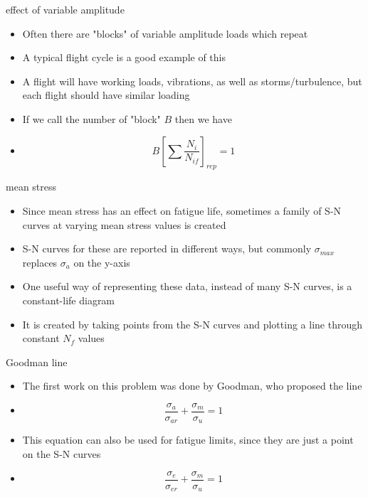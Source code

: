 \documentclass[10pt]{beamer}
\begin{document}
\begin{frame}{effect of variable amplitude}
	\begin{itemize}[<+->]
		\item Often there are "blocks" of variable amplitude loads which repeat
		\item A typical flight cycle is a good example of this
		\item A flight will have working loads, vibrations, as well as storms/turbulence, but each flight should have similar loading
		\item If we call the number of "block" $B$ then we have
		\item[] \begin{equation}
		B \left[\sum \frac{N_i}{N_{if}}\right]_{rep} = 1
		\end{equation}
	\end{itemize}
\end{frame}

\begin{frame}{mean stress}
	\begin{itemize}[<+->]
		\item Since mean stress has an effect on fatigue life, sometimes a family of S-N curves at varying mean stress values is created
		\item S-N curves for these are reported in different ways, but commonly $\sigma_{max}$ replaces $\sigma_a$ on the y-axis
		\item One useful way of representing these data, instead of many S-N curves, is a constant-life diagram
		\item It is created by taking points from the S-N curves and plotting a line through constant $N_f$ values
	\end{itemize}
\end{frame}

\begin{frame}{Goodman line}
	\begin{itemize}[<+->]
		\item The first work on this problem was done by Goodman, who proposed the line
		\item[] \begin{equation}
		\frac{\sigma_a}{\sigma_{ar}} + \frac{\sigma_m}{\sigma_u} = 1
		\end{equation}
		\item This equation can also be used for fatigue limits, since they are just a point on the S-N curves
		\item[] \begin{equation}
		\frac{\sigma_e}{\sigma_{er}} + \frac{\sigma_m}{\sigma_u} = 1
		\end{equation}
	\end{itemize}
\end{frame}
\end{document}
